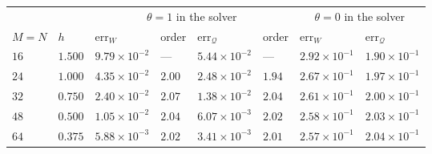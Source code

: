 \begin{tabular}{llllllll}
\toprule
 & & \multicolumn{4}{c}{\(\theta=1\) in the solver} & \multicolumn{2}{c}{\(\theta=0\) in the solver} \\
\cmidrule(lr){3-6}\cmidrule(lr){7-8}
\(M=N\) & \(h\) & \(\mathrm{err}_W\) & order & \(\mathrm{err}_{\mathcal{Q}}\) & order & \(\mathrm{err}_W\) & \(\mathrm{err}_{\mathcal{Q}}\) \\
\midrule
\(16\) & \(1.500\) & \(9.79\times10^{-2}\) & --- & \(5.44\times10^{-2}\) & --- & \(2.92\times10^{-1}\) & \(1.90\times10^{-1}\) \\
\(24\) & \(1.000\) & \(4.35\times10^{-2}\) & \(2.00\) & \(2.48\times10^{-2}\) & \(1.94\) & \(2.67\times10^{-1}\) & \(1.97\times10^{-1}\) \\
\(32\) & \(0.750\) & \(2.40\times10^{-2}\) & \(2.07\) & \(1.38\times10^{-2}\) & \(2.04\) & \(2.61\times10^{-1}\) & \(2.00\times10^{-1}\) \\
\(48\) & \(0.500\) & \(1.05\times10^{-2}\) & \(2.04\) & \(6.07\times10^{-3}\) & \(2.02\) & \(2.58\times10^{-1}\) & \(2.03\times10^{-1}\) \\
\(64\) & \(0.375\) & \(5.88\times10^{-3}\) & \(2.02\) & \(3.41\times10^{-3}\) & \(2.01\) & \(2.57\times10^{-1}\) & \(2.04\times10^{-1}\) \\
\bottomrule
\end{tabular}
